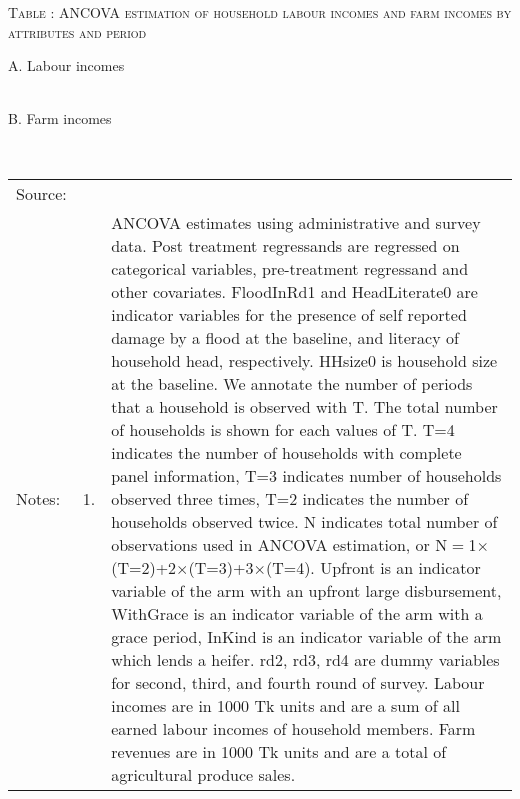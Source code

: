 \hspace{-1cm}\begin{minipage}[t]{14cm}
\hfil\textsc{\normalsize Table \thetable: ANCOVA estimation of household labour incomes and farm incomes by attributes and period\label{tab ANCOVA labour incomes timevarying attributes}}\\
\setlength{\tabcolsep}{1pt}
\setlength{\baselineskip}{8pt}
\renewcommand{\arraystretch}{.55}

\vspace{2ex}
A. Labour incomes\\
\hfil{}\\
B. Farm incomes\\
\hfil{}\\
\renewcommand{\arraystretch}{.8}
\setlength{\tabcolsep}{1pt}
\begin{tabular}{>{\hfill\scriptsize}p{1cm}<{}>{\hfill\scriptsize}p{.25cm}<{}>{\scriptsize}p{12cm}<{\hfill}}
Source:& \multicolumn{2}{l}{\scriptsize Estimated with GUK administrative and survey data.}\\
Notes: & 1. & ANCOVA estimates using administrative and survey data. Post treatment regressands are regressed on categorical variables, pre-treatment regressand and other covariates. \textsf{FloodInRd1} and \textsf{HeadLiterate0} are indicator variables for the presence of self reported damage by a flood at the baseline, and literacy of household head, respectively. \textsf{HHsize0} is household size at the baseline. We annotate the number of periods that a household is observed with \textsf{T}. The total number of households is shown for each values of \textsf{T}. \textsf{T=4} indicates the number of households with complete panel information, \textsf{T=3} indicates number of households observed three times, \textsf{T=2} indicates the number of households observed twice. \textsf{N} indicates total number of observations used in ANCOVA estimation, or \textsf{N$=$1$\times$(T=2)+2$\times$(T=3)+3$\times$(T=4)}.  \textsf{Upfront} is an indicator variable of the arm with an upfront large disbursement, \textsf{WithGrace} is an indicator variable of the arm with a grace period, \textsf{InKind} is an indicator variable of the arm which lends a heifer. \textsf{rd2, rd3, rd4} are dummy variables for second, third, and fourth round of survey. Labour incomes are in 1000 Tk units and are a sum of all earned labour incomes of household members. Farm revenues are in 1000 Tk units and are a total of agricultural produce sales. \\

\end{tabular}
\end{minipage}
